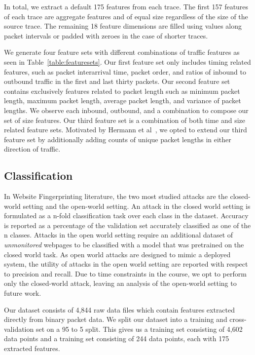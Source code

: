 \documentclass[sigconf,authorversion,nonacm]{acmart}
\begin{document}
In total, we extract a default 175 features from each trace. The first 157 features of each trace are aggregate features and of equal size regardless of the size of the source trace. The remaining 18 feature dimensions are filled using values along packet intervals or padded with zeroes in the case of shorter traces.

We generate four feature sets with different combinations of traffic features as seen in Table~\ref{table:featuresets}. Our first feature set only includes timing related features, such as packet interarrival time, packet order, and ratios of inbound to outbound traffic in the first and last thirty packets. Our second feature set contains exclusively features related to packet length such as minimum packet length, maximum packet length, average packet length, and variance of packet lengths. We observe each inbound, outbound, and a combination to compose our set of size features. Our third feature set is a combination of both time and size related feature sets. Motivated by Hermann et al~\citep{herrmann2009website}, we opted to extend our third feature set by additionally adding counts of unique packet lengths in either direction of traffic.

\subsection{Classification}
In Website Fingerprinting literature, the two most studied attacks are the closed-world setting and the open-world setting. An attack in the closed world setting is formulated as a n-fold classification task over each class in the dataset. Accuracy is reported as a percentage of the validation set accurately classified as one of the n classes. Attacks in the open world setting require an additional dataset of \textit{unmonitored} webpages to be classified with a model that was pretrained on the closed world task. As open world attacks are designed to mimic a deployed system, the utility of attacks in the open world setting are reported with respect to precision and recall. Due to time constraints in the course, we opt to perform only the closed-world attack, leaving an analysis of the open-world setting to future work.

Our dataset consists of 4,844 raw data files which contain features extracted directly from binary packet data. We split our dataset into a training and cross-validation set on a 95 to 5 split. This gives us a training set consisting of 4,602 data points and a training set consisting of 244 data points, each with 175 extracted features.
\end{document}

